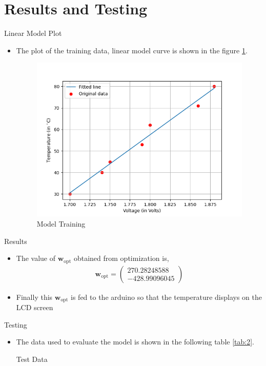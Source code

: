 \documentclass[10pt]{beamer}
\renewcommand{\vec}[1]{\boldsymbol{\mathbf{#1}}}
\newcommand{\myvec}[1]{\ensuremath{\begin{pmatrix}#1\end{pmatrix}}}
\begin{document}
\section{Results and Testing}
\begin{frame}{Linear Model Plot}
\begin{itemize}
\item The plot of the training data, linear model curve is shown in the figure \ref{fig:2}.
\begin{figure}[h]
    \centering
    \includegraphics[scale = 0.48]{figs/Train.png}
    \caption{Model Training}
    \label{fig:2}
\end{figure}
\end{itemize}
\end{frame}


\begin{frame}{Results}
    \begin{itemize}
    \item The value of $\vec{w}_\text{opt}$ obtained from optimization is,
    \begin{align}
    \vec{w}_\text{opt} = \myvec{270.28248588 \\ -428.99096045}
    \end{align}
    
    \item Finally this $\vec{w}_\text{opt}$ is fed to the arduino so that the temperature displays on the LCD screen
    \end{itemize}
\end{frame}

\begin{frame}{Testing}
\begin{itemize}
    \item The data used to evaluate the model is shown in the following table \ref{tab:2}.

\begin{table}[h]
    \centering
    
    \caption{Test Data}
    \label{tab:2}
\end{table}
\end{itemize}
\end{frame}
\end{document}
